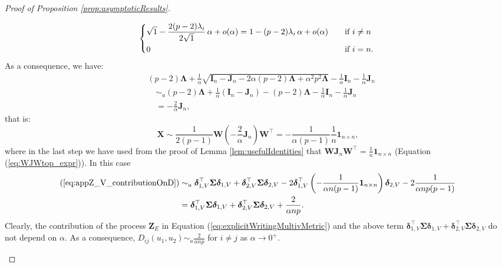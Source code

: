 \documentclass[12pt]{article}
\theoremstyle{plain}
\theoremstyle{remark}
\newcommand{\round}[1]{\left( #1 \right)}
\newcommand{\onenn}[0]{{\mathbf{1}_{n\times n}}}
\newcommand{\dVec}[1]{{\bm{#1}}}            %
\newcommand{\latMatr}[1]{\mathbf{#1}}          %
\newcommand{\grMatr}[1]{{\boldsymbol{#1}}}   %
\newcommand{\rVec}[1]{{\bm{#1}}}            %
\begin{document}
\begin{proof}[Proof of Proposition \ref{prop:asymptoticResults}]
\begin{enumerate}
\begin{equation*}
                \begin{dcases*}
                    \sqrt{1} - \frac{2(p-2)\lambda_i}{2\sqrt{1}}\, \alpha + o(\alpha)=1-(p-2)\lambda_i\,\alpha +o(\alpha) \quad &\text{if $i\ne n$}\\
                    0 & \text{if $i=n$.}
                \end{dcases*}    
            \end{equation*}
            As a consequence, we have:
            \begin{align*}
                &(p-2)\grMatr{\Lambda} + \frac{1}{\alpha}\sqrt{\latMatr I_n - \latMatr J_n - 2\alpha (p-2) \grMatr{\Lambda} + \alpha^2 p^2 \grMatr{\Lambda}} - \frac{1}{\alpha}\latMatr I_n - \frac{1}{\alpha}\latMatr J_n \\
                &\quad \sim_a (p-2)\grMatr{\Lambda} + \frac{1}{\alpha} (\latMatr I_n - \latMatr J_n) - (p-2)\grMatr{\Lambda} - \frac{1}{\alpha}\latMatr I_n - \frac{1}{\alpha}\latMatr J_n\\
                &\quad = -\frac{2}{\alpha} \latMatr J_n,
            \end{align*}
            that is:
            \begin{equation*}
                \latMatr X \sim \frac{1}{2(p-1)}\latMatr W \round{-\frac{2}{\alpha}\latMatr J_n} \latMatr W^\top=-\frac{1}{\alpha(p-1)} \frac{1}{n} \onenn,
            \end{equation*}
            where in the last step we have used from the proof of Lemma \ref{lem:usefulIdentities} that $\latMatr W \latMatr J_n \latMatr W^\top = \frac{1}{n} \onenn$ (Equation (\ref{eq:WJWtop_expr})). In this case
            \begin{align*}
                (\ref{eq:appZ_V_contributionOnD}) &\sim_a \dVec{\delta}_{ {1,V}}^\top {\grMatr{\Sigma}} \dVec{\delta}_{ {1,V}} + \dVec{\delta}_{ {2,V}}^\top {\grMatr{\Sigma}} \dVec{\delta}_{ {2,V}}-2\dVec{\delta}_{ {1,V}}^\top \round{-\frac{1}{\alpha n (p-1)}\onenn} \dVec{\delta}_{ {2,V}} -2\frac{1}{\alpha n p (p-1)}\\
                &=\dVec{\delta}_{ {1,V}}^\top {\grMatr{\Sigma}} \dVec{\delta}_{ {1,V}} + \dVec{\delta}_{ {2,V}}^\top {\grMatr{\Sigma}} \dVec{\delta}_{ {2,V}}+\frac{2}{\alpha n p}.
            \end{align*}
            Clearly, the contribution of the process $\rVec Z_E$ in Equation (\ref{eq:explicitWritingMultivMetric}) and the above term $\dVec{\delta}_{ {1,V}}^\top {\grMatr{\Sigma}} \dVec{\delta}_{ {1,V}} + \dVec{\delta}_{ {2,V}}^\top {\grMatr{\Sigma}} \dVec{\delta}_{ {2,V}}$ do not depend on $\alpha$. As a consequence, $D_{ij}(u_1,u_2)\sim_a \frac{2}{\alpha n p}$ for $i\ne j$ {as $\alpha \to 0^+$}.

\end{enumerate}
\end{proof}
\end{document}

